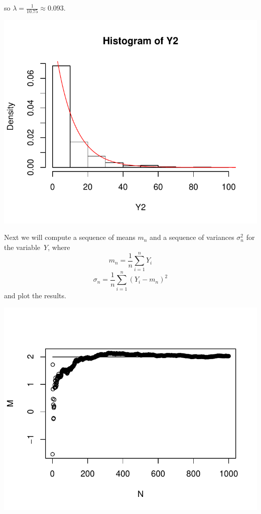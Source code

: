 \documentclass[12pt, a4paper]{article}\usepackage[]{graphicx}\usepackage[]{color}
\makeatletter
\def\maxwidth{ %
  \ifdim\Gin@nat@width>\linewidth
    \linewidth
  \else
    \Gin@nat@width
  \fi
}
\newenvironment{knitrout}{}{} %
\makeatother
\begin{document}
so $\lambda = \frac{1}{10.75}\approx 0.093$.

\begin{knitrout}
\color{fgcolor}

{\centering \includegraphics[width=\maxwidth]{figure/ex1_2hist-1} 

}



\end{knitrout}
Next we will compute a sequence of means $m_n$ and a sequence of variances $\sigma_n^2$ for the variable~$Y$, where
\[ m_n = \frac{1}{n} \sum_{i=1}^{n} Y_i \]
\[ \sigma_n = \frac{1}{n} \sum_{i=1}^{n} (Y_i - m_n)^2 \]
and plot the results.

\begin{knitrout}
\color{fgcolor}

{\centering \includegraphics[width=\maxwidth]{figure/ex1_2seq-1} 

}



\end{knitrout}
\end{document}
